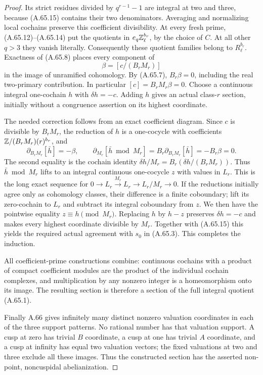 \begin{proof}
Its strict residues divided by $q^{r-1}-1$ are integral at two and
three, because (A.65.15) contains their two denominators.
Averaging and normalizing local cochains preserve this coefficient
divisibility.  At every fresh prime, (A.65.12)--(A.65.14) put the
quotients in $e_q\mathbb Z_\ell^{b_r}$, by the choice of $C$.
At all other $q>3$ they vanish literally.
Consequently these quotient families belong to $R_\ell^{b_r}$.
Exactness of (A.65.8) places every component of
\[
                  \beta=[c/(B_rM_r)]
 \tag{A.65.16}
\]
in the image of unramified cohomology.
By (A.65.7), $B_r\beta=0$, including the real two-primary contribution.
In particular $[c]=B_rM_r\beta=0$.
Choose a continuous integral one-cochain $h$ with $\delta h=-c$.
Adding $h$ gives an actual class-$r$ section, initially without a
congruence assertion on its highest coordinate.

The needed correction follows from an exact coefficient diagram.
Since $c$ is divisible by $B_rM_r$, the reduction of $h$ is a
one-cocycle with coefficients $\mathbb Z/(B_rM_r)(r)^{b_r}$, and
\[
 \partial_{B_rM_r}[\bar h]=-\beta,\qquad
 \partial_{M_r}[\bar h\bmod M_r]
                =B_r\partial_{B_rM_r}[\bar h]
                =-B_r\beta=0.
 \tag{A.65.17}
\]
The second equality is the cochain identity
$\delta h/M_r=B_r(\delta h/(B_rM_r))$.
Thus $\bar h\bmod M_r$ lifts to an integral continuous one-cocycle
$z$ with values in $L_r$.  This is the long exact sequence for
$0\to L_r\xrightarrow{M_r}L_r\to L_r/M_r\to0$.
If the reductions initially agree only as cohomology classes,
their difference is a finite coboundary; lift its zero-cochain to
$L_r$ and subtract its integral coboundary from $z$.
We then have the pointwise equality
$z\equiv h\pmod{M_r}$.
Replacing $h$ by $h-z$ preserves $\delta h=-c$ and makes every highest
coordinate divisible by $M_r$.  Together with (A.65.15) this yields
the required actual agreement with $s_0$ in (A.65.3).
This completes the induction.

All coefficient-prime constructions combine: continuous cochains with
a product of compact coefficient modules are the product of the
individual cochain complexes, and multiplication by any nonzero
integer is a homeomorphism onto its image.
The resulting section is therefore a section of the full integral
quotient (A.65.1).

Finally A.66 gives infinitely many distinct nonzero valuation
coordinates in each of the three support patterns.
No rational number has that valuation support.
A cusp at zero has trivial $B$ coordinate, a cusp at one has trivial
$A$ coordinate, and a cusp at infinity has equal two valuation vectors;
the fixed valuations at two and three exclude all these images.
Thus the constructed section has the asserted non-point,
noncuspidal abelianization.
\end{proof}

